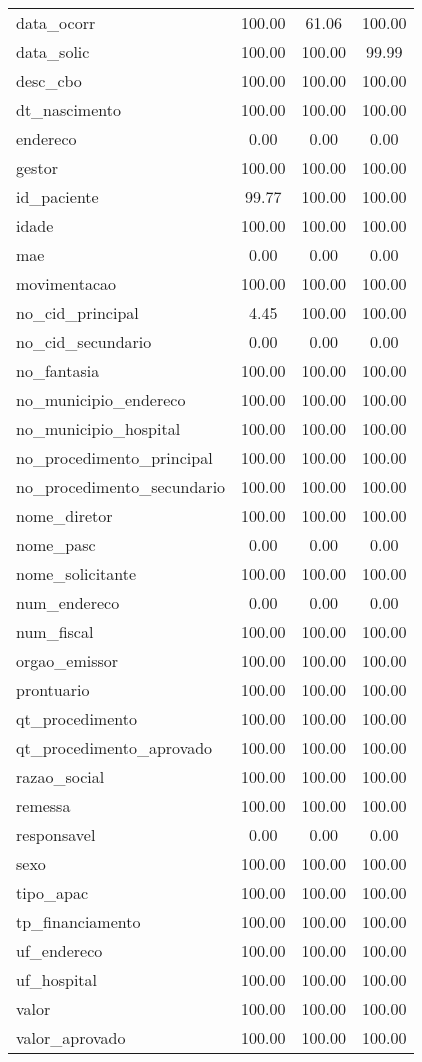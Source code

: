 \documentclass[
  12,
  table]{proadi}
\begin{document}
\begin{longtable}{lccc}
data\_ocorr & 100.00 & 61.06 & 100.00\\
data\_solic & 100.00 & 100.00 & 99.99\\
desc\_cbo & 100.00 & 100.00 & 100.00\\
dt\_nascimento & 100.00 & 100.00 & 100.00\\
\addlinespace
endereco & 0.00 & 0.00 & 0.00\\
gestor & 100.00 & 100.00 & 100.00\\
id\_paciente & 99.77 & 100.00 & 100.00\\
idade & 100.00 & 100.00 & 100.00\\
mae & 0.00 & 0.00 & 0.00\\
\addlinespace
movimentacao & 100.00 & 100.00 & 100.00\\
no\_cid\_principal & 4.45 & 100.00 & 100.00\\
no\_cid\_secundario & 0.00 & 0.00 & 0.00\\
no\_fantasia & 100.00 & 100.00 & 100.00\\
no\_municipio\_endereco & 100.00 & 100.00 & 100.00\\
\addlinespace
no\_municipio\_hospital & 100.00 & 100.00 & 100.00\\
no\_procedimento\_principal & 100.00 & 100.00 & 100.00\\
no\_procedimento\_secundario & 100.00 & 100.00 & 100.00\\
nome\_diretor & 100.00 & 100.00 & 100.00\\
nome\_pasc & 0.00 & 0.00 & 0.00\\
\addlinespace
nome\_solicitante & 100.00 & 100.00 & 100.00\\
num\_endereco & 0.00 & 0.00 & 0.00\\
num\_fiscal & 100.00 & 100.00 & 100.00\\
orgao\_emissor & 100.00 & 100.00 & 100.00\\
prontuario & 100.00 & 100.00 & 100.00\\
\addlinespace
qt\_procedimento & 100.00 & 100.00 & 100.00\\
qt\_procedimento\_aprovado & 100.00 & 100.00 & 100.00\\
razao\_social & 100.00 & 100.00 & 100.00\\
remessa & 100.00 & 100.00 & 100.00\\
responsavel & 0.00 & 0.00 & 0.00\\
\addlinespace
sexo & 100.00 & 100.00 & 100.00\\
tipo\_apac & 100.00 & 100.00 & 100.00\\
tp\_financiamento & 100.00 & 100.00 & 100.00\\
uf\_endereco & 100.00 & 100.00 & 100.00\\
uf\_hospital & 100.00 & 100.00 & 100.00\\
\addlinespace
valor & 100.00 & 100.00 & 100.00\\
valor\_aprovado & 100.00 & 100.00 & 100.00\\*
\end{longtable}
\endgroup{}
\end{document}
